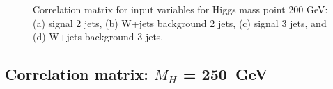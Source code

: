 \begin{figure}[bthp!]
\caption{\label{fig:FigCorr200Mu} 
Correlation matrix for input variables for Higgs mass point 200 GeV:
(a) signal 2 jets, (b) W+jets background 2 jets, 
(c) signal 3 jets, and (d) W+jets background 3 jets.
}
\end{figure}
\newpage
\subsection{Correlation matrix: \texorpdfstring{$M_H$}{M(H)} = 250~GeV}
\begin{figure}[bthp!]
\vspace*{1mm} \\
\end{figure}
